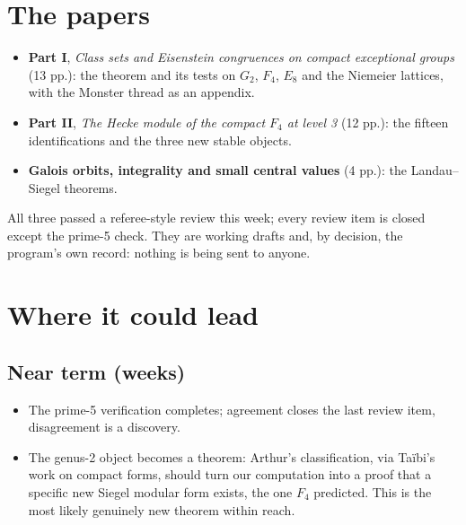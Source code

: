 \documentclass[11pt]{article}
\begin{document}
\section{The papers}
\begin{itemize}[nosep]
\item \textbf{Part I}, \emph{Class sets and Eisenstein congruences on compact exceptional groups} (13 pp.): the theorem and its tests on $G_2$, $F_4$, $E_8$ and the Niemeier lattices, with the Monster thread as an appendix.
\item \textbf{Part II}, \emph{The Hecke module of the compact $F_4$ at level 3} (12 pp.): the fifteen identifications and the three new stable objects.
\item \textbf{Galois orbits, integrality and small central values} (4 pp.): the Landau--Siegel theorems.
\end{itemize}
All three passed a referee-style review this week; every review item is closed except the prime-5 check. They are working drafts and, by decision, the program's own record: nothing is being sent to anyone.

\section{Where it could lead}
\subsection{Near term (weeks)}
\begin{itemize}[nosep]
\item The prime-5 verification completes; agreement closes the last review item, disagreement is a discovery.
\item The genus-2 object becomes a theorem: Arthur's classification, via Ta\"ibi's work on compact forms, should turn our computation into a proof that a specific new Siegel modular form exists, the one $F_4$ predicted. This is the most likely genuinely new theorem within reach.

\end{itemize}
\end{document}

